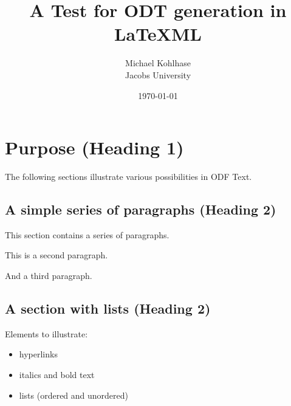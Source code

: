 \documentclass{article}
\title{A Test for ODT generation in LaTeXML}
\author{Michael Kohlhase\\Jacobs University}%
\date{\today}
\begin{document}
\maketitle

\section{Purpose (Heading 1)}
The following sections illustrate various possibilities in ODF Text.

\subsection{A simple series of paragraphs (Heading 2)}

This section contains a series of paragraphs.

This is a second paragraph.

And a third paragraph.

\subsection{A section with lists (Heading 2)}
Elements to illustrate:
 \begin{itemize}
 \item hyperlinks
 \item italics and bold text
 \item lists (ordered and unordered)
\end{itemize}

\end{document}
